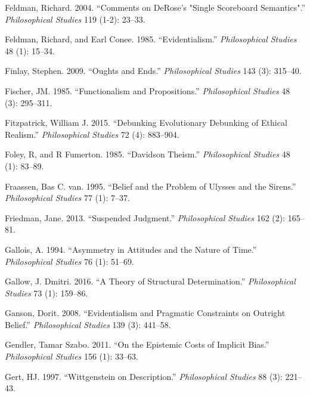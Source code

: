 \documentclass[
  10pt,
  letterpaper,
  DIV=11,
  numbers=noendperiod,
  twoside]{scrartcl}
\newlength{\cslhangindent}
\newenvironment{CSLReferences}[2] %
 {\begin{list}{}{%
  \setlength{\itemindent}{0pt}
  \setlength{\leftmargin}{0pt}
  \setlength{\parsep}{0pt}
  \ifodd #1
   \setlength{\leftmargin}{\cslhangindent}
   \setlength{\itemindent}{-1\cslhangindent}
  \fi
  \setlength{\itemsep}{#2\baselineskip}}}
 {\end{list}}
\begin{document}
\begin{CSLReferences}{1}{0}
Feldman, Richard. 2004. {``Comments on DeRose's "Single Scoreboard
Semantics".''} \emph{Philosophical Studies} 119 (1-2): 23--33.

Feldman, Richard, and Earl Conee. 1985. {``Evidentialism.''}
\emph{Philosophical Studies} 48 (1): 15--34.

Finlay, Stephen. 2009. {``Oughts and Ends.''} \emph{Philosophical
Studies} 143 (3): 315--40.

Fischer, JM. 1985. {``Functionalism and Propositions.''}
\emph{Philosophical Studies} 48 (3): 295--311.

Fitzpatrick, William J. 2015. {``Debunking Evolutionary Debunking of
Ethical Realism.''} \emph{Philosophical Studies} 72 (4): 883--904.

Foley, R, and R Fumerton. 1985. {``Davidson Theism.''}
\emph{Philosophical Studies} 48 (1): 83--89.

Fraassen, Bas C. van. 1995. {``Belief and the Problem of Ulysses and the
Sirens.''} \emph{Philosophical Studies} 77 (1): 7--37.

Friedman, Jane. 2013. {``Suspended Judgment.''} \emph{Philosophical
Studies} 162 (2): 165--81.

Gallois, A. 1994. {``Asymmetry in Attitudes and the Nature of Time.''}
\emph{Philosophical Studies} 76 (1): 51--69.

Gallow, J. Dmitri. 2016. {``A Theory of Structural Determination.''}
\emph{Philosophical Studies} 73 (1): 159--86.

Ganson, Dorit. 2008. {``Evidentialism and Pragmatic Constraints on
Outright Belief.''} \emph{Philosophical Studies} 139 (3): 441--58.

Gendler, Tamar Szabo. 2011. {``On the Epistemic Costs of Implicit
Bias.''} \emph{Philosophical Studies} 156 (1): 33--63.

Gert, HJ. 1997. {``Wittgenstein on Description.''} \emph{Philosophical
Studies} 88 (3): 221--43.


\end{CSLReferences}
\end{document}
